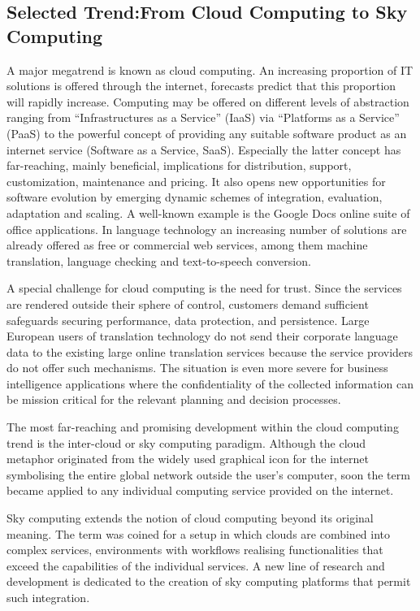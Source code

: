 \documentclass[10pt, plain]{../../metanetpaper}
\begin{document}
\begin{multicols}{2}
\subsection[Selected Trend: From Cloud Computing to Sky Computing]{Selected Trend:\newline From Cloud Computing to Sky Computing}
\label{sec:cloud-sky-computing}

A major megatrend is known as cloud computing. An increasing proportion of IT solutions is offered through the internet, forecasts predict that this proportion will rapidly increase. Computing may be offered on different levels of abstraction ranging from “Infrastructures as a Service” (IaaS) via “Platforms as a Service” (PaaS) to the powerful concept of providing any suitable software product as an internet service (Software as a Service, SaaS). Especially the latter concept has far-reaching, mainly beneficial, implications for distribution, support, customization, maintenance and pricing. It also opens new opportunities for software evolution by emerging dynamic schemes of integration, evaluation, adaptation and scaling. A well-known example is the Google Docs online suite of office applications. In language technology an increasing number of solutions are already offered as free or commercial web services, among them machine translation, language checking and text-to-speech conversion.

A special challenge for cloud computing is the need for trust. Since the services are rendered outside their sphere of control, customers demand sufficient safeguards securing performance, data protection, and persistence. Large European users of translation technology do not send their corporate language data to the existing large online translation services because the service providers do not offer such mechanisms. The situation is even more severe for business intelligence applications where the confidentiality of the collected information can be mission critical for the relevant planning and decision processes.  

The most far-reaching and promising development within the cloud computing trend is the inter-cloud or sky computing paradigm. Although the cloud metaphor originated from the widely used graphical icon for the internet symbolising the entire global network outside the user’s computer, soon the term became applied to any individual computing service provided on the internet.  

Sky computing extends the notion of cloud computing beyond its original meaning. The term was coined for a setup in which clouds are combined into complex services, environments with workflows realising functionalities that exceed the capabilities of the individual services. A new line of research and development is dedicated to the creation of sky computing platforms that permit such integration.


\end{multicols}
\end{document}
